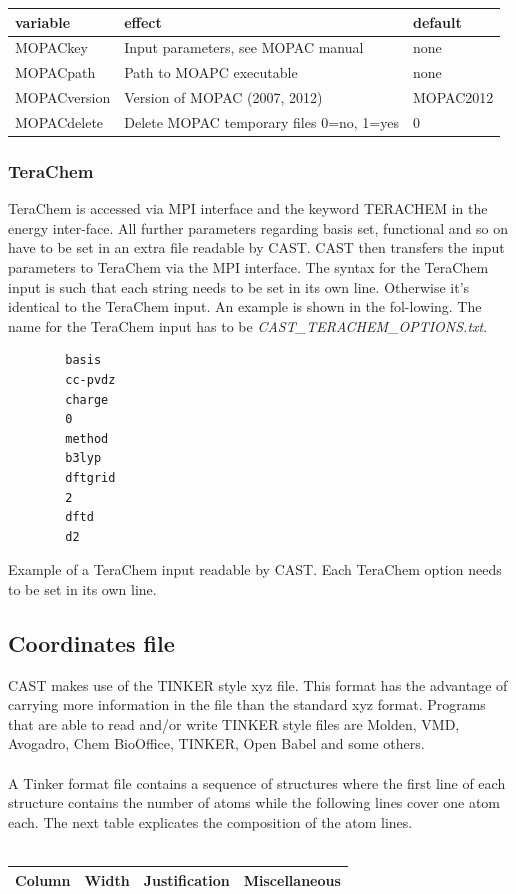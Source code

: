 \documentclass[10pt,a4paper]{article} %
\newif\ifverbose %
\begin{document}
{		\begin{tabularx}{\textwidth}{l|l|l}
			variable & effect & default \\
			\hline
			MOPACkey & Input parameters, see MOPAC manual & none\\
			MOPACpath & Path to MOAPC executable & none\\
			MOPACversion & Version of MOPAC (2007, 2012) & MOPAC2012\\
			MOPACdelete & Delete MOPAC temporary files 0=no, 1=yes & 0\\

		\end{tabularx}

		\subsubsection{TeraChem}
		TeraChem\supercite{terachem} is accessed via MPI\supercite{mpi} interface and the keyword TERACHEM in the energy inter-face. All further parameters regarding basis set, functional and so on have to be set in an extra file readable by CAST. CAST then transfers the input parameters to TeraChem via the MPI interface. The syntax for the TeraChem input is such that each string needs to be set in its own line. Otherwise it’s identical to the TeraChem input. An example is shown in the fol-lowing. The name for the TeraChem input has to be \textit{CAST_TERACHEM_OPTIONS.txt}.

		\begin{lstlisting}
		basis
		cc-pvdz
		charge
		0
		method
		b3lyp
		dftgrid
		2
		dftd
		d2
		\end{lstlisting}

		Example of a TeraChem input readable by CAST. Each TeraChem option needs to be set in its own line.


	\subsection{Coordinates file}
	CAST makes use of the TINKER style xyz file. This format has the advantage of carrying more information in the file than the standard xyz format. Programs that are able to read and/or write TINKER style files are Molden, VMD, Avogadro, Chem BioOffice, TINKER, Open Babel and some others. \\~\\
	A Tinker format file contains a sequence of structures where the first line of each structure contains the number of atoms while the following lines cover one atom each. The next table explicates the composition of the atom lines.\\~\\
	\ifverbose
	\begin{tabularx}{\textwidth}{l|l|l|l}
		Column & Width & Justification & Miscellaneous\\
		\hline


\end{tabularx}}
\end{document}
